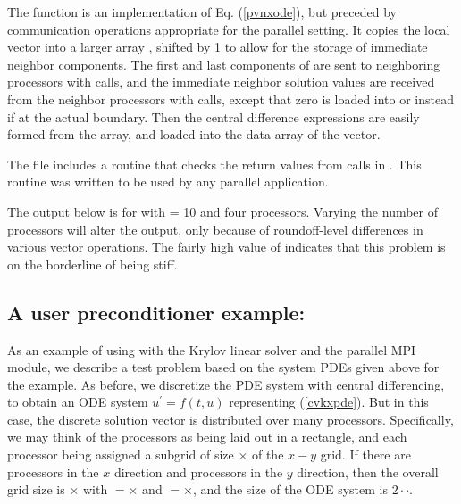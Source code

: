 The  function is an implementation of Eq. (\ref{pvnxode}), but preceded
by communication operations appropriate for the parallel setting.
It copies the local vector  into a larger array , shifted by 1
to allow for the storage of immediate neighbor components.  The first and last
components of  are sent to neighboring processors with  calls,
and the immediate neighbor solution values are received from the neighbor
processors with  calls, except that zero is loaded into 
or  instead if at the actual boundary.  Then the central
difference expressions are easily formed from the  array, and loaded into
the data array of the  vector.

The  file includes a routine  that checks the
return values from calls in .  This routine was written to be used
by any parallel {\sundials} application.

The output below is for  with  = 10 and four processors. 
Varying the number of processors will alter the output, only because
of roundoff-level differences in various vector operations.  The fairly
high value of  indicates that this problem is on the borderline
of being stiff.



\subsection{A user preconditioner example: }\label{ss:pvkx}

As an example of using {\cvode} with the Krylov linear solver
{\cvspgmr} and the parallel MPI {\nvecp} module, we describe a test
problem based on the system PDEs given above for the  example.  
As before, we discretize the PDE system with central differencing, to
obtain an ODE system $u^\prime = f(t,u)$ representing (\ref{cvkxpde}).  
But in this case, the discrete solution vector is distributed over
many processors.  Specifically, we may think of the processors as
being laid out in a rectangle, and each processor being assigned a
subgrid of size $\times$ of the $x-y$ grid. If
there are  processors in the $x$ direction and 
processors in the $y$ direction, then the overall grid size is
$\times$ with $=$$\times$ and
$=$$\times$, and the size of the ODE system is
$2\cdot$$\cdot$.  

